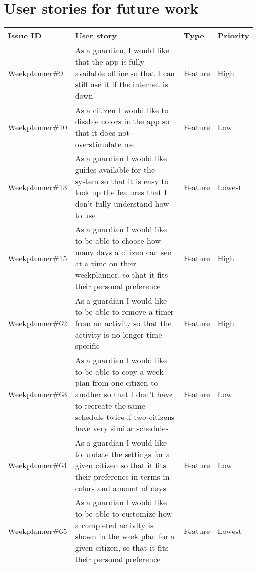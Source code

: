 \section{User stories for future work}\label{appendix:future-work-user-stories}
\begin{longtable}{|p{2.9cm}|p{7cm}|p{1.4cm}|p{1.5cm}|}
    \hline
    Issue ID         & User story                                                                                                                                                                & Type & Priority     \\ \hline
    Weekplanner\#9   & As a guardian, I would like that the app is fully available offline so that I can still use it if the internet is down                                                    & Feature & High      \\ \hline
    Weekplanner\#10  & As a citizen I would like to disable colors in the app so that it does not overstimulate me                                                                               & Feature & Low      \\ \hline
    Weekplanner\#13  & As a guardian I would like guides available for the system so that it is easy to look up the features that I don't fully understand how to use                            & Feature & Lowest      \\ \hline
    Weekplanner\#15  & As a guardian I would like to be able to choose how many days a citizen can see at a time on their weekplanner, so that it fits their personal preference                 & Feature & High    \\ \hline
    Weekplanner\#62  & As a guardian I would like to be able to remove a timer from an activity so that the activity is no longer time specific                                                  & Feature & High  \\ \hline
    Weekplanner\#63  & As a guardian I would like to be able to copy a week plan from one citizen to another so that I don’t have to recreate the same schedule twice if two citizens have very similar schedules  & Feature & Low  \\ \hline
    Weekplanner\#64  & As a guardian I would like to update the settings for a given citizen so that it fits their preference in terms in colors and amount of days                              & Feature & Low  \\ \hline
    Weekplanner\#65  & As a guardian I would like to be able to customize how a completed activity is shown in the week plan for a given citizen, so that it fits their personal preference      & Feature & Lowest  \\ \hline

\end{longtable}
